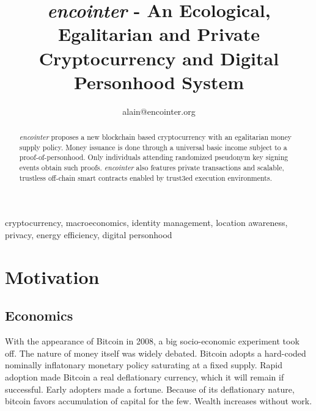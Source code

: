 \documentclass[conference]{IEEEtran}
\begin{document}
\newcommand{\encointer}{\textsl{encointer} }



\title{\encointer - An Ecological, Egalitarian and Private Cryptocurrency and Digital Personhood System\\
}

\author{
alain@encointer.org}

\maketitle


\begin{abstract}
\encointer proposes a new blockchain based cryptocurrency with  an egalitarian money supply policy. Money issuance is done through a universal basic income subject to a proof-of-personhood. Only individuals attending randomized pseudonym key signing events obtain such proofs. \encointer also features private transactions and scalable, trustless off-chain smart contracts enabled by trust3ed execution environments.
\end{abstract}

\begin{IEEEkeywords}
cryptocurrency, macroeconomics, identity management, location awareness, privacy, energy efficiency, digital personhood
\end{IEEEkeywords}

\section{Motivation}
\subsection{Economics}
With the appearance of Bitcoin \cite{nakamoto08} in 2008, a big socio-economic experiment took off. The nature of money itself was widely debated. Bitcoin adopts a hard-coded nominally inflatonary monetary policy saturating at a fixed supply. Rapid adoption made Bitcoin a real deflationary currency, which it will remain if successful. Early adopters made a fortune. Because of its deflationary nature, bitcoin favors accumulation of capital for the few. Wealth increases without work.
\end{document}
